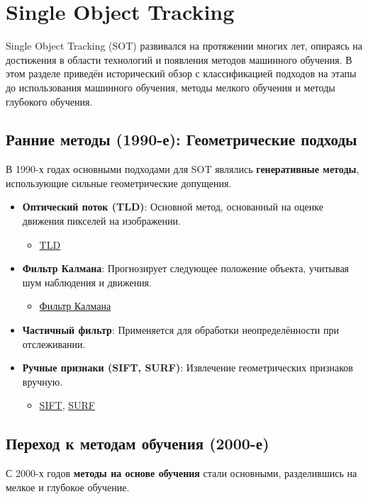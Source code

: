 \thispagestyle{empty}
\section{Single Object Tracking}

Single Object Tracking (SOT) развивался на протяжении многих лет, опираясь на достижения в области технологий и появления методов машинного обучения. В этом разделе приведён исторический обзор с классификацией подходов на этапы до использования машинного обучения, методы мелкого обучения и методы глубокого обучения.

\subsection{Ранние методы (1990-е): Геометрические подходы}
В 1990-х годах основными подходами для SOT являлись \textbf{генеративные методы}, использующие сильные геометрические допущения.

\begin{itemize}
    \item \textbf{Оптический поток (TLD)}: Основной метод, основанный на оценке движения пикселей на изображении.
    \begin{itemize}
        \item \href{http://vision.deis.unibo.it/ssalti/papers/Salti-TIP12.pdf}{TLD}
    \end{itemize}
    \item \textbf{Фильтр Калмана}: Прогнозирует следующее положение объекта, учитывая шум наблюдения и движения.
    \begin{itemize}
        \item \href{https://www.sciencedirect.com/science/article/pii/S1534580701000363}{Фильтр Калмана}
    \end{itemize}
    \item \textbf{Частичный фильтр}: Применяется для обработки неопределённости при отслеживании.
    \item \textbf{Ручные признаки (SIFT, SURF)}: Извлечение геометрических признаков вручную.
    \begin{itemize}
        \item \href{https://www.cs.ubc.ca/~lowe/papers/ijcv04.pdf}{SIFT}, \href{https://www.vision.ee.ethz.ch/en/publications/papers/articles/eth_biwi_00378.pdf}{SURF}
    \end{itemize}
\end{itemize}

\subsection*{Переход к методам обучения (2000-е)}
С 2000-х годов \textbf{методы на основе обучения} стали основными, разделившись на мелкое и глубокое обучение.

